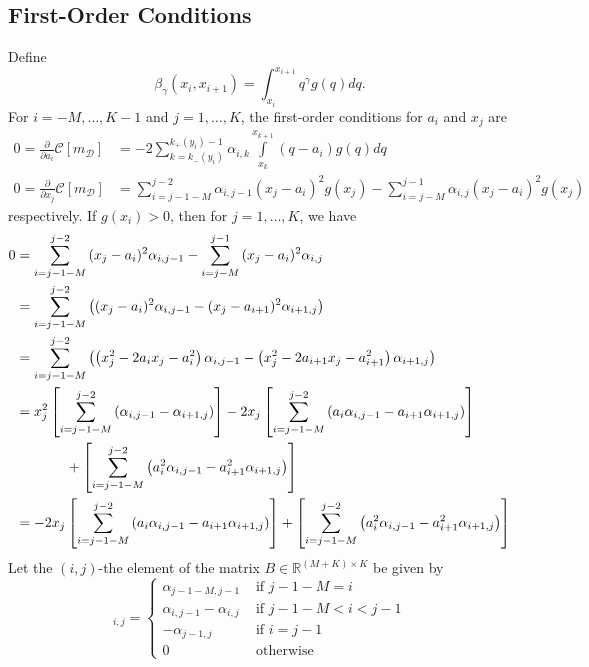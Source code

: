 \documentclass[12pt]{article}
\begin{document}
\subsection{First-Order Conditions}
Define
\begin{equation}
	\beta_{\gamma}(x_{i},x_{i+1})=\int_{x_{i}}^{x_{i+1}}{q^{\gamma}g(q)dq}.
\end{equation}
For $i=-M,\ldots,K-1$ and $j=1,\ldots,K$, the first-order conditions for $a_{i}$ and $x_{j}$ are 
\begin{align}
	0=\frac{\partial}{\partial a_{i}}\mathcal{C}[m_{\mathcal{D}}]&=-2\sum_{k=k_{-}(y_{i})}^{k_{+}(y_{i})-1}{\alpha_{i,k}\int\limits_{x_{k}}^{x_{k+1}}{(q-a_{i})g(q)dq}}\label{foc_a}\\
	0=\frac{\partial}{\partial x_{j}}\mathcal{C}[m_{\mathcal{D}}]&=\sum_{i=j-1-M}^{j-2}{\alpha_{i,j-1}(x_{j}-a_{i})^{2}g(x_{j})}-\sum_{i=j-M}^{j-1}{\alpha_{i,j}(x_{j}-a_{i})^{2}g(x_{j})}
\end{align}
respectively. If $g(x_{i})>0$, then for $j=1,\ldots,K$, we have
\begin{align}
	0&=\sum_{i=j-1-M}^{j-2}{(x_{j}-a_{i})^{2}}\alpha_{i,j-1}-\sum_{i=j-M}^{j-1}{(x_{j}-a_{i})^{2}\alpha_{i,j}}\\
	&=\sum_{i=j-1-M}^{j-2}{\left((x_{j}-a_{i})^{2}\alpha_{i,j-1}-(x_{j}-a_{i+1})^{2}\alpha_{i+1,j}\right)}\\
	&=\sum_{i=j-1-M}^{j-2}{\left(\left(x_{j}^{2}-2a_{i}x_{j}-a_{i}^{2}\right)\alpha_{i,j-1}-\left(x_{j}^{2}-2a_{i+1}x_{j}-a_{i+1}^{2}\right)\alpha_{i+1,j}\right)}\\
	&=x_{j}^{2}\left[\sum_{i=j-1-M}^{j-2}{(\alpha_{i,j-1}-\alpha_{i+1,j})}\right]-2x_{j}\left[\sum_{i=j-1-M}^{j-2}{\left(a_{i}\alpha_{i,j-1}-a_{i+1}\alpha_{i+1,j}\right)}\right]\notag\\
	&\hspace{.5in}+\left[\sum_{i=j-1-M}^{j-2}{\left(a_{i}^{2}\alpha_{i,j-1}-a_{i+1}^{2}\alpha_{i+1,j}\right)}\right]\\
	&=-2x_{j}\left[\sum_{i=j-1-M}^{j-2}{\left(a_{i}\alpha_{i,j-1}-a_{i+1}\alpha_{i+1,j}\right)}\right]+\left[\sum_{i=j-1-M}^{j-2}{\left(a_{i}^{2}\alpha_{i,j-1}-a_{i+1}^{2}\alpha_{i+1,j}\right)}\right]
\end{align}
Let the $(i,j)$-the element of the matrix $B\in\mathbb{R}^{(M+K)\times K}$ be given by
\begin{equation}
	[B]_{i,j}=
	\begin{cases}
		\alpha_{j-1-M,j-1} & \text{ if } j-1-M=i \\
		\alpha_{i,j-1}-\alpha_{i,j} & \text{ if } j-1-M<i<j-1 \\
		-\alpha_{j-1,j} & \text{ if } i=j-1 \\
		0 & \text{ otherwise }
	\end{cases}
\end{equation}
\end{document}
